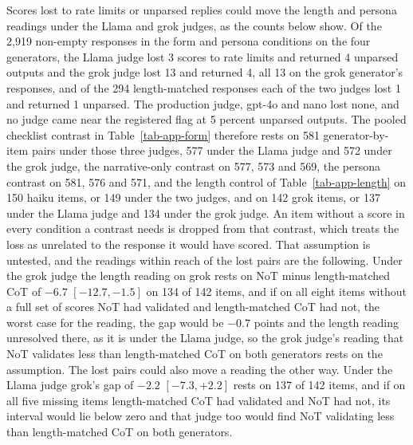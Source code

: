 Scores lost to rate limits or unparsed replies could move the length and
persona readings under the Llama and grok judges, as the counts below show.
Of the 2,919 non-empty responses in the form and persona conditions on the
four generators, the Llama judge lost 3 scores to rate limits and returned 4
unparsed outputs and the grok judge lost 13 and returned 4, all 13 on the grok
generator's responses, and of the 294 length-matched responses each of the two
judges lost 1 and returned 1 unparsed. The production judge, gpt-4o and nano
lost none, and no judge came near the registered flag at 5 percent unparsed
outputs.
The pooled checklist contrast in Table~\ref{tab-app-form}
therefore rests on 581 generator-by-item pairs under those three judges, 577
under the Llama judge and 572 under the grok judge, the narrative-only
contrast on 577, 573 and 569, the persona contrast on 581, 576 and 571, and
the length control of Table~\ref{tab-app-length} on 150 haiku items, or 149
under the two judges, and on 142 grok items, or 137 under the Llama judge and
134 under the grok judge. An item without a score in every condition a
contrast needs is dropped from that contrast, which treats the loss as
unrelated to the response it would have scored. That assumption is untested,
and the readings within reach of the lost pairs are the following. Under the
grok judge the length reading on grok
rests on NoT minus length-matched CoT of $-6.7$ $[-12.7, -1.5]$ on 134 of 142
items, and if on all eight items without a full set of scores NoT had
validated and length-matched CoT had not, the worst case for the reading,
the gap would be $-0.7$ points and the length reading unresolved there, as it
is under the Llama judge, so the grok judge's reading that NoT validates less
than length-matched CoT on both generators rests on the assumption. The lost
pairs could also move a reading the other way. Under the
Llama judge grok's gap of $-2.2$ $[-7.3, +2.2]$ rests on 137 of 142 items,
and if on all five missing items length-matched CoT had validated and NoT had
not, its interval would lie below zero and that judge too would find NoT
validating less than length-matched CoT on both generators.
